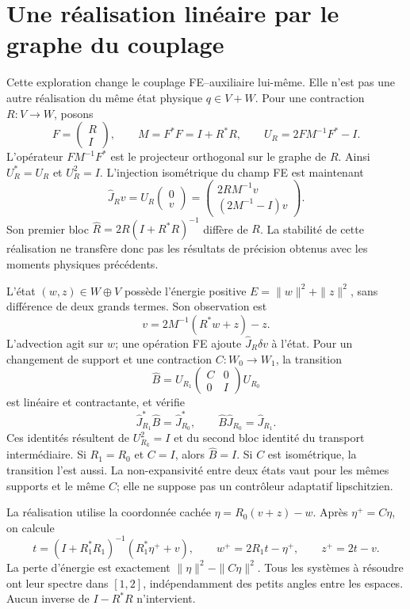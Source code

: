 \documentclass[11pt,a4paper]{article}
\begin{document}
\section{Une réalisation linéaire par le graphe du couplage}
Cette exploration change le couplage FE--auxiliaire lui-même. Elle n'est
pas une autre réalisation du même état physique $q\in V+W$. Pour une
contraction $R:V\to W$, posons
\[
 F=\begin{pmatrix}R\\I\end{pmatrix},\qquad
 M=F^*F=I+R^*R,\qquad U_R=2FM^{-1}F^*-I.
\]
L'opérateur $FM^{-1}F^*$ est le projecteur orthogonal sur le graphe
de $R$. Ainsi $U_R^*=U_R$ et $U_R^2=I$. L'injection isométrique
du champ FE est maintenant
\[
 \widehat J_Rv=U_R\begin{pmatrix}0\\v\end{pmatrix}
 =\begin{pmatrix}2RM^{-1}v\\(2M^{-1}-I)v\end{pmatrix}.
\]
Son premier bloc $\widehat R=2R(I+R^*R)^{-1}$ diffère de $R$.
La stabilité de cette réalisation ne transfère donc pas les résultats
de précision obtenus avec les moments physiques précédents.

L'état $(w,z)\in W\oplus V$ possède l'énergie positive
$E=\|w\|^2+\|z\|^2$, sans différence de deux grands termes.
Son observation est
\[
 v=2M^{-1}(R^*w+z)-z.
\]
L'advection agit sur $w$; une opération FE ajoute
$\widehat J_R\delta v$ à l'état. Pour un changement de support
et une contraction $C:W_0\to W_1$, la transition
\[
 \widehat B=U_{R_1}\begin{pmatrix}C&0\\0&I\end{pmatrix}U_{R_0}
\]
est linéaire et contractante, et vérifie
\[
 \widehat J_{R_1}^*\widehat B=\widehat J_{R_0}^*,\qquad
 \widehat B\widehat J_{R_0}=\widehat J_{R_1}.
\]
Ces identités résultent de $U_{R_k}^2=I$ et du second bloc identité
du transport intermédiaire. Si $R_1=R_0$ et $C=I$, alors
$\widehat B=I$. Si $C$ est isométrique, la transition l'est aussi.
La non-expansivité entre deux états vaut pour les mêmes supports et
le même $C$; elle ne suppose pas un contrôleur adaptatif lipschitzien.

La réalisation utilise la coordonnée cachée
$\eta=R_0(v+z)-w$. Après $\eta^+=C\eta$, on calcule
\[
 t=(I+R_1^*R_1)^{-1}(R_1^*\eta^++v),\qquad
 w^+=2R_1t-\eta^+,\qquad z^+=2t-v.
\]
La perte d'énergie est exactement
$\|\eta\|^2-\|C\eta\|^2$. Tous les systèmes à résoudre ont
leur spectre dans $[1,2]$, indépendamment des petits angles entre
les espaces. Aucun inverse de $I-R^*R$ n'intervient.
\end{document}
